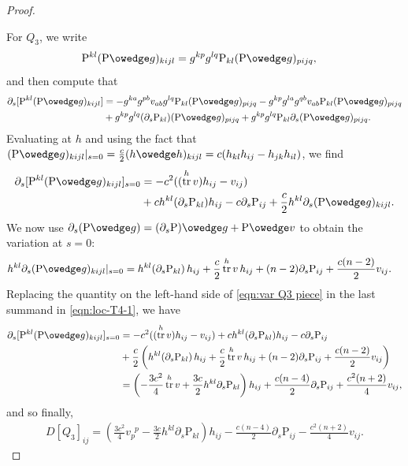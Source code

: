 \documentclass[10pt,reqno]{amsart}
\DeclareMathOperator{\tr}{tr}
\renewcommand{\P}{\mathrm{P}}
\newcommand{\vdu}[2]{v_{#1}^{\phantom{#1} #2}}
\begin{document}
\begin{proof}
\
	
For $Q_3$, we write
\begin{align*}
\P^{kl} (\P \owedge g)_{kijl} &= g^{kp} g^{lq} \P_{kl} (\P \owedge g)_{pijq},
\end{align*}
and then compute that
\begin{align*}\begin{aligned}
\partial_s [\P^{kl} (\P \owedge g)_{kijl}] &= -g^{ka} g^{pb} v_{ab}  g^{lq} \P_{kl} (\P \owedge g)_{pijq} - g^{kp} g^{la} g^{qb} v_{ab} \P_{kl} (\P \owedge g)_{pijq}\\
&+g^{kp} g^{lq} (\partial_s \P_{kl}) (\P \owedge g)_{pijq} + g^{kp} g^{lq} \P_{kl} \partial_s (\P \owedge g)_{pijq}.
\end{aligned}
\end{align*}
Evaluating at $h$ and using the fact that $(\P \owedge g)_{kijl}|_{s=0} = \frac{c}{2} (h \owedge h)_{kijl} = c (h_{kl} h_{ij} - h_{jk} h_{il})$, we find
\begin{align} \label{eqn:loc-T4-1}
\begin{aligned}
\partial_s [\P^{kl} (\P \owedge g)_{kijl}]_{s=0} &= -c^2 (( \tr^h v) h_{ij} - v_{ij}) \\
&+c h^{kl} (\partial_s \P_{kl})h_{ij} - c \partial_s \P_{ij} + \frac{c}{2} h^{kl} \partial_s (\P \owedge g)_{kijl}.
\end{aligned}
\end{align}
We now use $\partial_s (\P \owedge g) = (\partial_s \P) \owedge g + \P \owedge v$ to obtain the variation at $s=0$:
\begin{align}
\label{eqn:var Q3 piece}
h^{kl} \partial_s (\P \owedge g)_{kijl} |_{s=0}&= h^{kl} (\partial_s \P_{kl}) \, h_{ij}  + \frac{c}{2} \tr^h v \, h_{ij} + (n-2) \partial_s \P_{ij} + \frac{c(n-2)}{2} v_{ij}.
\end{align}
Replacing the quantity on the left-hand side of  \eqref{eqn:var Q3 piece} in the last summand in \eqref{eqn:loc-T4-1}, we have
\begin{align*} 
\begin{aligned}
\partial_s [\P^{kl} (\P \owedge g)_{kijl}]_{s=0} &= -c^2 (( \tr^h v) h_{ij} - v_{ij}) +c h^{kl} (\partial_s \P_{kl})h_{ij} - c \partial_s \P_{ij} \\
&+ \frac{c}{2} \left( h^{kl} (\partial_s \P_{kl}) \, h_{ij}  + \frac{c}{2} \tr^h v \, h_{ij} + (n-2) \partial_s \P_{ij} + \frac{c(n-2)}{2} v_{ij} \right) \\
&= \left( -\frac{3 c^2}{4} \tr^h v  + \frac{3 c}{2} h^{kl} \partial_s \P_{kl} \right) h_{ij} +\frac{c(n-4)}{2} \partial_s \P_{ij} + \frac{c^2 (n+2)}{4} v_{ij},
\end{aligned}
\end{align*}
and so finally, 
\begin{align}\label{eqn:loc-DQ3}
D[ Q_3]_{ij} = \left( \frac{3 c^2}{4} \vdu{p}{p} - \frac{3 c}{2} h^{kl} \partial_s \P_{kl} \right) h_{ij} -\frac{c(n-4)}{2} \partial_s \P_{ij} - \frac{c^2 (n+2)}{4} v_{ij}.
\end{align}


\end{proof}
\end{document}
